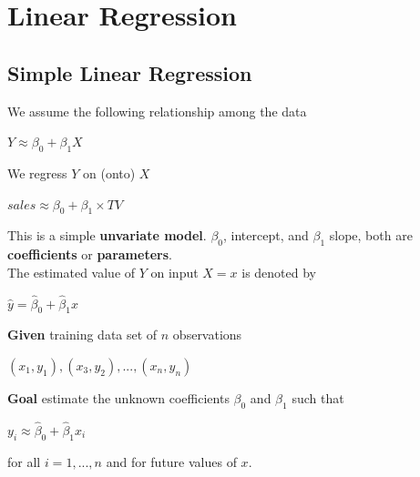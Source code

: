 

\chapter{Linear Regression}

	\section{Simple Linear Regression}
		We assume the following relationship among the data
		\begin{center}
			$Y \approx \beta_0 + \beta_1X$
		\end{center}
		We regress $Y$ on (onto) $X$
		\begin{center}
			$sales \approx \beta_0 + \beta_1 \times TV$
		\end{center}
		This is a simple \textbf{unvariate model}.
		$\beta_0$, intercept, and $\beta_1$ slope, both are \textbf{coefficients} or \textbf{parameters}.\\
		The estimated value of $Y$ on input $X=x$ is denoted by
		\begin{center}
			$\hat{y} = \hat{\beta}_0 + \hat{\beta}_1 x$
		\end{center}
		\textbf{Given} training data set of $n$ observations
		\begin{center}
			$(x_1,y_1),(x_3,y_2),...,(x_n,y_n)$
		\end{center}
		\textbf{Goal} estimate the unknown coefficients $\beta_0$ and $\beta_1$ such that
		\begin{center}
			$y_i \approx \hat{\beta}_0 + \hat{\beta}_1 x_i$
		\end{center}
		for all $i=1,...,n$ and for future values of $x$.
	
	
